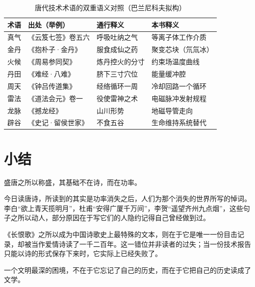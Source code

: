 \begin{table}[htbp]
\centering
\caption{唐代技术术语的双重语义对照（巴兰尼科夫拟构）}
\label{tab:terms}
\footnotesize
\begin{tabular}{@{}p{16mm}p{40mm}p{34mm}p{42mm}@{}}
\toprule
\textbf{术语} & \textbf{出处（举例）} & \textbf{通行释义} & \textbf{本书释义}\\
\midrule
真气 & 《云笈七签》卷五六 & 呼吸吐纳之气 & 等离子体工作介质\\
金丹 & 《抱朴子·金丹》 & 服食成仙之药 & 聚变芯块（氘氚冰）\\
火候 & 《周易参同契》 & 炼丹控火的分寸 & 约束场温度曲线\\
丹田 & 《难经·八难》 & 脐下三寸穴位 & 能量缓冲腔\\
周天 & 《钟吕传道集》 & 经络循环一周 & 冷却回路一个循环\\
雷法 & 《道法会元》卷一 & 役使雷神之术 & 电磁脉冲发射规程\\
龙脉 & 《撼龙经》 & 山川形势 & 地磁导管走向\\
辟谷 & 《史记·留侯世家》 & 不食五谷 & 生命维持系统替代\\
\bottomrule
\end{tabular}
\end{table}

\section{小结}

盛唐之所以称盛，其基础不在诗，而在功率。

今日读唐诗，所读到的其实是功率消失之后，人们为那个消失的世界所写的悼词。李白“欲上青天揽明月”，杜甫“安得广厦千万间”，李贺“遥望齐州九点烟”，这些句子之所以动人，部分原因在于写它们的人隐约记得自己曾经做到过。

《长恨歌》之所以成为中国诗歌史上最特殊的文本，则在于它是唯一一份目击记录，却被当作爱情诗读了一千二百年。这一错位并非读者的过失；当一份技术报告只能以诗的形式保存下来时，它实际上已经失败了。

一个文明最深的困境，不在于它忘记了自己的历史，而在于它把自己的历史读成了文学。
